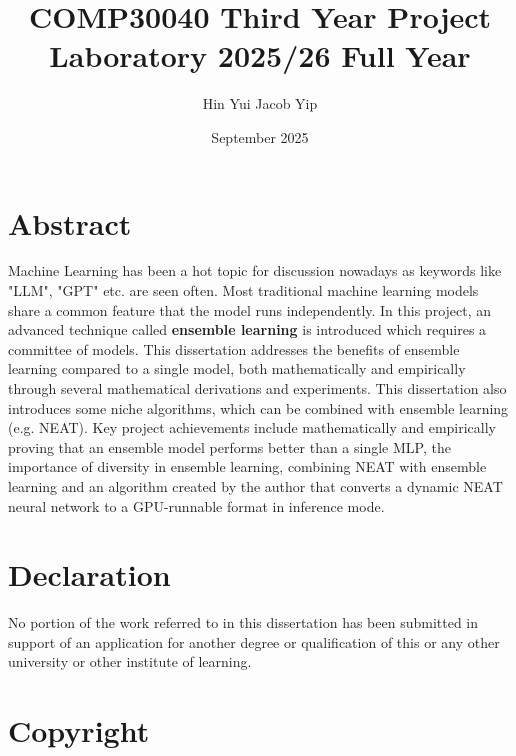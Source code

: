 \documentclass{article}
\title{COMP30040 Third Year Project Laboratory 2025/26 Full Year}
\author{Hin Yui Jacob Yip}
\date{September 2025}
\begin{document}
\maketitle


\newpage
\tableofcontents
\newpage


\hypersetup{
    linkcolor=blue
}


\section{Abstract}
Machine Learning has been a hot topic for discussion nowadays as keywords like "LLM", "GPT" etc. are seen often. Most traditional machine learning models share a common feature that the model runs independently. 
In this project, an advanced technique called \textbf{ensemble learning} is introduced which requires a committee of models. This dissertation addresses the benefits of ensemble learning compared to a single model, both mathematically and empirically through several mathematical derivations and experiments. 
This dissertation also introduces some niche algorithms, which can be combined with ensemble learning (e.g. NEAT). 
Key project achievements include mathematically and empirically proving that an ensemble model performs better than a single MLP, the importance of diversity in ensemble learning, combining NEAT with ensemble learning and an algorithm created by the author that converts a dynamic NEAT neural network to a GPU-runnable format in inference mode. 


\section{Declaration}
No portion of the work referred to in this dissertation has
been submitted in support of an application for another
degree or qualification of this or any other university or
other institute of learning. 


\section{Copyright}
\end{document}
